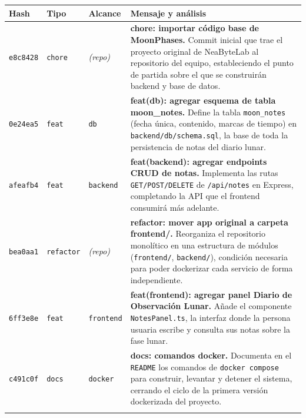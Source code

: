 \begin{center}
\begin{tabularx}{\textwidth}{@{}l l l >{\raggedright\arraybackslash}X@{}}
\toprule
\textbf{Hash} & \textbf{Tipo} & \textbf{Alcance} & \textbf{Mensaje y análisis} \\
\midrule

\texttt{e8c8428} &
\textcolor{gitchore}{\texttt{chore}} &
\textit{(repo)} &
\textbf{chore: importar código base de MoonPhases.}
Commit inicial que trae el proyecto original de NeaByteLab al repositorio del equipo, estableciendo el punto de partida sobre el que se construirán backend y base de datos. \\
\addlinespace

\texttt{0e24ea5} &
\textcolor{gitfeat}{\texttt{feat}} &
\texttt{db} &
\textbf{feat(db): agregar esquema de tabla moon\_notes.}
Define la tabla \texttt{moon\_notes} (fecha única, contenido, marcas de tiempo) en \texttt{backend/db/schema.sql}, la base de toda la persistencia de notas del diario lunar. \\
\addlinespace

\texttt{afeafb4} &
\textcolor{gitfeat}{\texttt{feat}} &
\texttt{backend} &
\textbf{feat(backend): agregar endpoints CRUD de notas.}
Implementa las rutas \texttt{GET/POST/DELETE} de \texttt{/api/notes} en Express, completando la API que el frontend consumirá más adelante. \\
\addlinespace

\texttt{bea0aa1} &
\textcolor{gitrefactor}{\texttt{refactor}} &
\textit{(repo)} &
\textbf{refactor: mover app original a carpeta frontend/.}
Reorganiza el repositorio monolítico en una estructura de módulos (\texttt{frontend/}, \texttt{backend/}), condición necesaria para poder dockerizar cada servicio de forma independiente. \\
\addlinespace

\texttt{6ff3e8e} &
\textcolor{gitfeat}{\texttt{feat}} &
\texttt{frontend} &
\textbf{feat(frontend): agregar panel Diario de Observación Lunar.}
Añade el componente \texttt{NotesPanel.ts}, la interfaz donde la persona usuaria escribe y consulta sus notas sobre la fase lunar. \\
\addlinespace

\texttt{c491c0f} &
\textcolor{gitdocs}{\texttt{docs}} &
\texttt{docker} &
\textbf{docs: comandos docker.}
Documenta en el \texttt{README} los comandos de \texttt{docker compose} para construir, levantar y detener el sistema, cerrando el ciclo de la primera versión dockerizada del proyecto. \\
\addlinespace


\end{tabularx}
\end{center}

